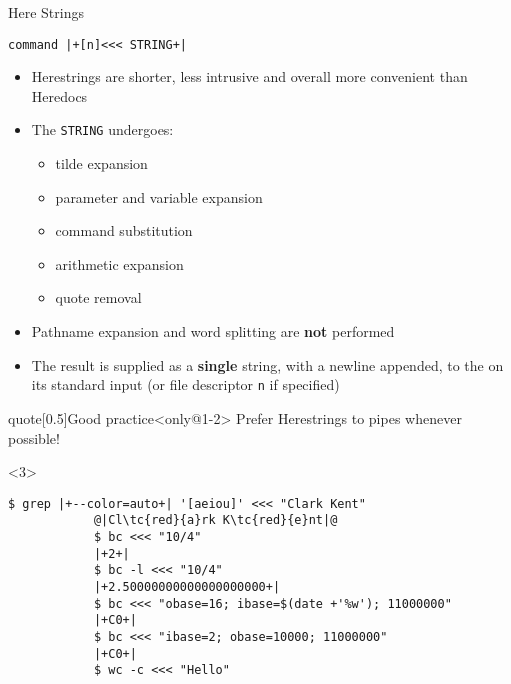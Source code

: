 \begin{frame}[fragile]{Here Strings}
    \vspace{-3mm}
    \begin{lstlisting}[style=MyBash, numbers=none]
        command |+[n]<<< STRING+|
    \end{lstlisting}
    \vspace{2mm}
    \begin{itemize}[<only@1-2>]
        \item Herestrings are shorter, less intrusive and overall more convenient than Heredocs\\[-0.5ex]
        \item The \texttt{STRING} undergoes:
              \begin{itemize}
                  \item tilde expansion
                  \item parameter and variable expansion
                  \item command substitution
                  \item arithmetic expansion
                  \item quote removal
              \end{itemize}
        \item \alert{Pathname expansion} and word splitting \alert{are \textbf{not} performed}
        \item The result is supplied as a \alert{\textbf{single}} string, with a newline appended, to the  on its standard input (or file descriptor \texttt{n} if specified)
    \end{itemize}
    \begin{varblock}{quote}[0.5\textwidth]{Good practice}<only@1-2>
        \textnormal{Prefer Herestrings to pipes whenever possible!}
    \end{varblock}
    \begin{onlyenv}<3>
        \begin{lstlisting}[style=MyBash, style=oddnumbers]
            $ grep |+--color=auto+| '[aeiou]' <<< "Clark Kent"
            @|Cl\tc{red}{a}rk K\tc{red}{e}nt|@
            $ bc <<< "10/4"
            |+2+|
            $ bc -l <<< "10/4"
            |+2.50000000000000000000+|
            $ bc <<< "obase=16; ibase=$(date +'%w'); 11000000"
            |+C0+|
            $ bc <<< "ibase=2; obase=10000; 11000000"
            |+C0+|
            $ wc -c <<< "Hello"

\end{lstlisting}
\end{onlyenv}
\end{frame}
